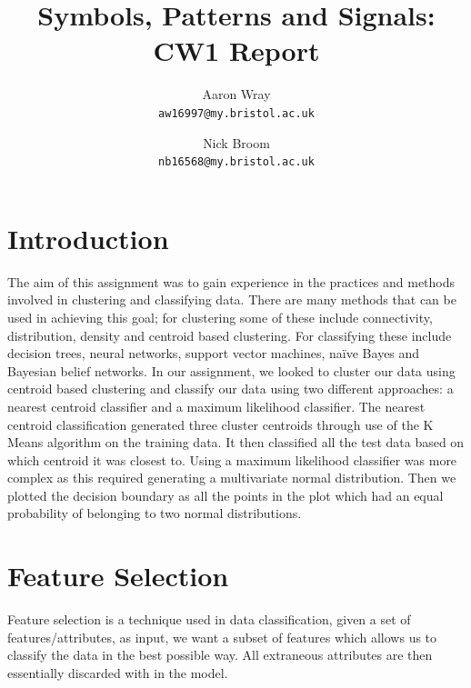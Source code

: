 \documentclass[A4Page,11pt]{article}
\title{\vspace{-2.0cm}Symbols, Patterns and Signals: CW1 Report}\vspace{-3ex}
\author{
    Aaron Wray\\
    \texttt{aw16997@my.bristol.ac.uk}
    \and
    Nick Broom\\
    \texttt{nb16568@my.bristol.ac.uk}
}
\begin{document}
\maketitle



\section{Introduction}

The aim of this assignment was to gain experience in the practices and methods involved in clustering and classifying data. There are many methods that can be used in achieving this goal; for clustering  some of these include connectivity, distribution, density and centroid based clustering. For classifying these include decision trees, neural networks, support vector machines, naïve Bayes and Bayesian belief networks. In our assignment, we looked to cluster our data using centroid based clustering and classify our data using two different approaches: a nearest centroid classifier and a maximum likelihood classifier. The nearest centroid classification generated three cluster centroids through use of the K Means algorithm on the training data. It then classified all the test data based on which centroid it was closest to. Using a maximum likelihood classifier was more complex as this required generating a multivariate normal distribution. Then we plotted the decision boundary as all the points in the plot which had an equal probability of belonging to two normal distributions. 

\section{Feature Selection}

Feature selection is a technique used in data classification, given a set of features/attributes, as input, we want a subset of features which allows us to classify the data in the best possible way. All extraneous attributes are then essentially discarded with in the model.\par
\end{document}
